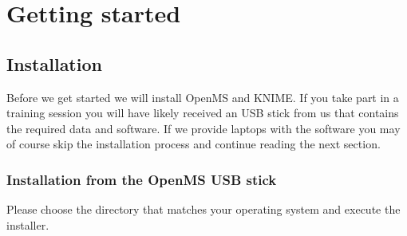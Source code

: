 
\newcommand{\WindowsKnimeInstallerName}{Windows / KNIME\ 3.5.0\ Installer\ (64bit).exe}	
\newcommand{\WindowsOpenMSInstallerName}{Windows / OpenMS-2.3.0\_Win64\_setup.exe}	
\newcommand{\WindowsOpenMSPrereqInstallerName}{Windows / OpenMS-2.3-prerequisites-installer.exe}
\newcommand{\WindowsPrerequisitesLink}{http://sourceforge.net/projects/open-ms/files/OpenMS/OpenMS-2.3/OpenMS-2.3-prerequisites-installer.exe/download}
\newcommand{\WindowsDefaultPWizFolder}{C: / Program\ Files / OpenMS-2.3.0 / share / OpenMS / THIRDPARTY / pwiz-bin}
\newcommand{\MacKnimeInstallerName}{Mac / knime\_3.5.0.app.macosx.cocoa.x86\_64.dmg}	
\newcommand{\MacOpenMSInstallerName}{Mac / OpenMS-2.3.0-Darwin.dmg}
\newcommand{\KnimeUpdateSite}{http://update.knime.org/analytics-platform/3.5}
\newcommand{\KnimeTrustedSite}{http://tech.knime.org/update/community-contributions/trusted/3.5}
\newcommand{\KnimeTrunkSite}{http://tech.knime.org/update/community-contributions/trunk/}


\setcounter{equation}{0}

\section{Getting started}

\subsection{Installation}

Before we get started we will install OpenMS and KNIME. If you take part in a training session you will have likely received an USB stick from us that contains the required data and software. If we provide laptops with the software you may of course skip the installation process and continue reading the next section.

\subsubsection{Installation from the OpenMS USB stick}
Please choose the directory that matches your operating system and execute the installer. 

